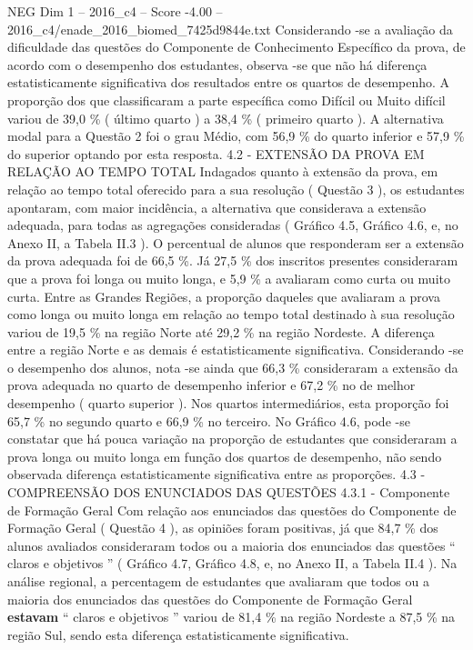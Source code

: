 \begin{textsample}{NEG Dim 1 – 2016\_c4 – Score -4.00 – 2016\_c4/enade\_2016\_biomed\_7425d9844e.txt}
Considerando -se a avaliação da dificuldade das questões do Componente de Conhecimento Específico da prova, de acordo com o desempenho dos estudantes, observa -se que não há diferença estatisticamente significativa dos resultados entre os quartos de desempenho.
A proporção dos que classificaram a parte específica como Difícil ou Muito difícil variou de 39,0 \% ( último quarto ) a 38,4 \% ( primeiro quarto ).
A alternativa modal para a Questão 2 foi o grau Médio, com 56,9 \% do quarto inferior e 57,9 \% do superior optando por esta resposta. 4.2 - EXTENSÃO DA PROVA EM RELAÇÃO AO TEMPO TOTAL Indagados quanto à extensão da prova, em relação ao tempo total oferecido para a sua resolução ( Questão 3 ), os estudantes apontaram, com maior incidência, a alternativa que considerava a extensão adequada, para todas as agregações consideradas ( Gráfico 4.5, Gráfico 4.6, e, no Anexo II, a Tabela II.3 ).
O percentual de alunos que responderam ser a extensão da prova adequada foi de 66,5 \%.
Já 27,5 \% dos inscritos presentes consideraram que a prova foi longa ou muito longa, e 5,9 \% a avaliaram como curta ou muito curta.
Entre as Grandes Regiões, a proporção daqueles que avaliaram a prova como longa ou muito longa em relação ao tempo total destinado à sua resolução variou de 19,5 \% na região Norte até 29,2 \% na região Nordeste.
A diferença entre a região Norte e as demais é estatisticamente significativa.
Considerando -se o desempenho dos alunos, nota -se ainda que 66,3 \% consideraram a extensão da prova adequada no quarto de desempenho inferior e 67,2 \% no de melhor desempenho ( quarto superior ).
Nos quartos intermediários, esta proporção foi 65,7 \% no segundo quarto e 66,9 \% no terceiro.
No Gráfico 4.6, pode -se constatar que há pouca variação na proporção de estudantes que consideraram a prova longa ou muito longa em função dos quartos de desempenho, não sendo observada diferença estatisticamente significativa entre as proporções. 4.3 - COMPREENSÃO DOS ENUNCIADOS DAS QUESTÕES 4.3.1 - Componente de Formação Geral Com relação aos enunciados das questões do Componente de Formação Geral ( Questão 4 ), as opiniões foram positivas, já que 84,7 \% dos alunos avaliados consideraram todos ou a maioria dos enunciados das questões “ claros e objetivos ” ( Gráfico 4.7, Gráfico 4.8, e, no Anexo II, a Tabela II.4 ).
Na análise regional, a percentagem de estudantes que avaliaram que todos ou a maioria dos enunciados das questões do Componente de Formação Geral \textbf{estavam} “ claros e objetivos ” variou de 81,4 \% na região Nordeste a 87,5 \% na região Sul, sendo esta diferença estatisticamente significativa.

\end{textsample}

